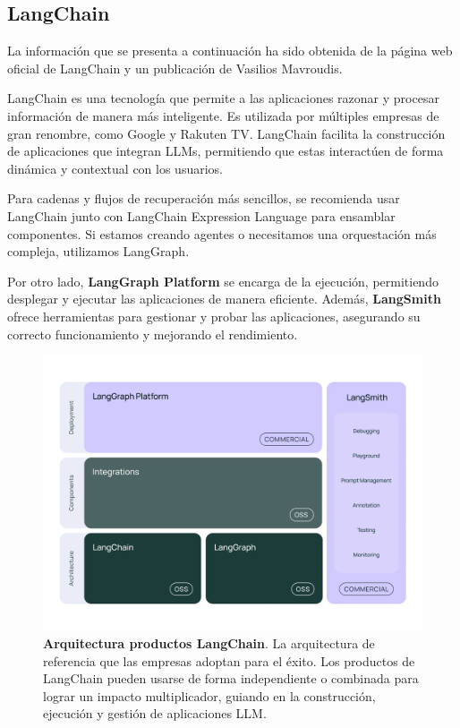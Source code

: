 \newpage

\subsection{LangChain}

La información que se presenta a continuación ha sido obtenida de la página web oficial de LangChain y un publicación de Vasilios Mavroudis.

LangChain es una tecnología que permite a las aplicaciones razonar y procesar información de manera más inteligente. Es utilizada por múltiples empresas de gran renombre, como Google y Rakuten TV. LangChain facilita la construcción de aplicaciones que integran LLMs, permitiendo que estas interactúen de forma dinámica y contextual con los usuarios.

Para cadenas y flujos de recuperación más sencillos, se recomienda usar LangChain junto con LangChain Expression Language para ensamblar componentes. Si estamos creando agentes o necesitamos una orquestación más compleja, utilizamos LangGraph.

Por otro lado, \textbf{LangGraph Platform} se encarga de la ejecución, permitiendo desplegar y ejecutar las aplicaciones de manera eficiente. Además, \textbf{LangSmith} ofrece herramientas para gestionar y probar las aplicaciones, asegurando su correcto funcionamiento y mejorando el rendimiento. \cite{PaginaLangChainOficial} \cite{mavroudis2024langchain}



\begin{figure}[H]
    \centering
    \includegraphics[width=\linewidth]{imagenes/lg.jpg}
    \caption[\textbf{Arquitectura productos LangChain}.]{\textbf{Arquitectura productos LangChain}. La arquitectura de referencia que las empresas adoptan para el éxito. Los productos de LangChain pueden usarse de forma independiente o combinada para lograr un impacto multiplicador, guiando en la construcción, ejecución y gestión de aplicaciones LLM. \cite{PaginaLangChainOficial}}
    \label{productos-lang-chain} 
\end{figure}


